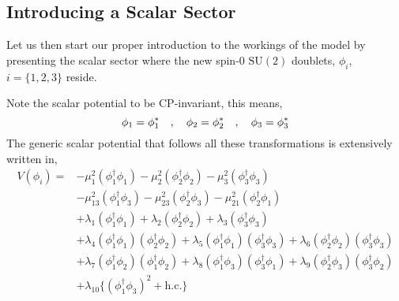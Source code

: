 \subsection{Introducing a Scalar Sector}

Let us then start our proper introduction to the workings of the model by presenting the scalar sector where the new spin-0 $\mathrm{SU(2)}$ doublets, $\phi_i$, $i=\{1,2,3\}$ reside. 
\begin{comment}
The scalar doublets are made to transform under the imposed $\mathrm{U(1)}\times \mathbb{Z}_2$ symmetries as, 
%
\begin{equation}
\begin{split}
\mathrm{U(1)} & : \phi_1 \rightarrow \phi_1 e^{i \alpha} \quad ,
            \quad \phi_3 \rightarrow \phi_3 e^{i \alpha}  \\
\mathbb{Z}_2  & : \phi_1 \rightarrow -\phi_1 \ \ \quad , 
            \quad \phi_2 \rightarrow \phi_2  \quad , 
            \quad \phi_3 \rightarrow \phi_3 \quad .
\end{split}
\end{equation}
\end{comment}
Note the scalar potential to be CP-invariant, this means,
\begin{equation}
\phi_1 = \phi_1^{\**} \quad , \quad \phi_2 = \phi_2^{\**} \quad , \quad 
\phi_3 = \phi_3^{\**} 
\end{equation}
The generic scalar potential that follows all these transformations is extensively written in, 
\begin{equation}
\begin{split}
V(\phi_i) = & 
- \mu_1^2 \left( \phi^{\dagger}_1 \phi_1 \right) 
- \mu_2^2 \left( \phi^{\dagger}_2 \phi_2 \right)  
- \mu_3^2 \left( \phi^{\dagger}_3 \phi_3 \right) \\ 
& - \mu_{13}^2 \left( \phi^{\dagger}_1 \phi_3  \right) 
  - \mu_{23}^2 \left( \phi^{\dagger}_2 \phi_3  \right)  
  - \mu_{21}^2 \left( \phi^{\dagger}_2 \phi_1  \right)  \\
& + \lambda_1 \left( \phi^{\dagger}_1 \phi_1 \right) 
  + \lambda_2 \left( \phi^{\dagger}_2 \phi_2 \right)  
  + \lambda_3 \left( \phi^{\dagger}_3 \phi_3 \right) \\  
& + \lambda_4 \left( \phi^{\dagger}_1 \phi_1 \right)  \left( \phi^{\dagger}_2 \phi_2 \right) 
  + \lambda_5 \left( \phi^{\dagger}_1 \phi_1 \right)  \left( \phi^{\dagger}_3 \phi_3 \right)  
  + \lambda_6 \left( \phi^{\dagger}_2 \phi_2 \right)  \left( \phi^{\dagger}_3 \phi_3 \right)  \\ 
& + \lambda_7 \left( \phi^{\dagger}_1 \phi_2 \right)  \left( \phi^{\dagger}_1 \phi_2 \right)  
  + \lambda_8 \left( \phi^{\dagger}_1 \phi_3 \right)  \left( \phi^{\dagger}_3 \phi_1 \right)   
  + \lambda_9 \left( \phi^{\dagger}_2 \phi_3 \right)  \left( \phi^{\dagger}_3 \phi_2 \right)  \\
& + \lambda_{10} \Bigg\{ \left( \phi^{\dagger}_1 \phi_3 \right)^2 + \text{h.c.} \Bigg\}   
\end{split} 
\end{equation}
